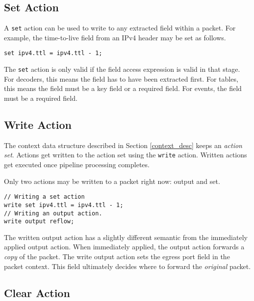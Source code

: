 \subsection{Set Action} \label{tut:set_action}

A \texttt{set} action can be used to write to any extracted field within a packet. For example, the time-to-live field from an IPv4 header may be set as follows.

\begin{codepage}
\begin{lstlisting}
set ipv4.ttl = ipv4.ttl - 1;
\end{lstlisting}
\end{codepage}

The \texttt{set} action is only valid if the field access expression is valid in that stage. For decoders, this means the field has to have been extracted first. For tables, this means the field must be a key field or a required field. For events, the field must be a required field.

\subsection{Write Action} \label{tut:write_action}

The context data structure described in Section \ref{context_desc} keeps an \textit{action set}. Actions get written to the action set using the \texttt{write} action. Written actions get executed once pipeline processing completes.

Only two actions may be written to a packet right now: output and set.

\begin{lstlisting}
// Writing a set action
write set ipv4.ttl = ipv4.ttl - 1;
// Writing an output action.
write output reflow;
\end{lstlisting}

The written output action has a slightly different semantic from the immediately applied output action. When immediately applied, the output action forwards a \textit{copy} of the packet. The write output action sets the egress port field in the packet context. This field ultimately decides where to forward the \textit{original} packet.

\subsection{Clear Action} \label{tut:clear_action}

